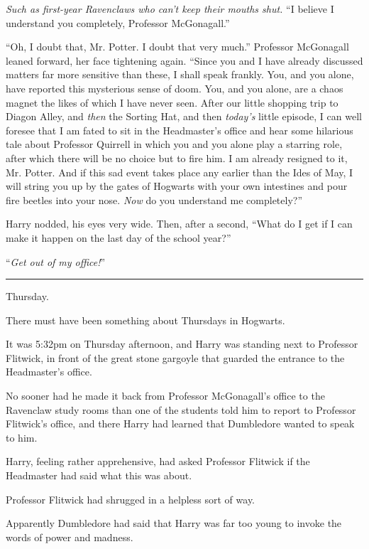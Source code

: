 \emph{Such as first-year Ravenclaws who can't keep their mouths shut.} ``I believe I understand you completely, Professor McGonagall.''

``Oh, I doubt that, Mr. Potter. I doubt that very much.'' Professor McGonagall leaned forward, her face tightening again. ``Since you and I have already discussed matters far more sensitive than these, I shall speak frankly. You, and you alone, have reported this mysterious sense of doom. You, and you alone, are a chaos magnet the likes of which I have never seen. After our little shopping trip to Diagon Alley, and \emph{then} the Sorting Hat, and then \emph{today's} little episode, I can well foresee that I am fated to sit in the Headmaster's office and hear some hilarious tale about Professor Quirrell in which you and you alone play a starring role, after which there will be no choice but to fire him. I am already resigned to it, Mr. Potter. And if this sad event takes place any earlier than the Ides of May, I will string you up by the gates of Hogwarts with your own intestines and pour fire beetles into your nose. \emph{Now} do you understand me completely?''

Harry nodded, his eyes very wide. Then, after a second, ``What do I get if I can make it happen on the last day of the school year?''

``\emph{Get out of my office!}''

\begin{center}\rule{3in}{0.4pt}\end{center}

Thursday.

There must have been something about Thursdays in Hogwarts.

It was 5:32pm on Thursday afternoon, and Harry was standing next to Professor Flitwick, in front of the great stone gargoyle that guarded the entrance to the Headmaster's office.

No sooner had he made it back from Professor McGonagall's office to the Ravenclaw study rooms than one of the students told him to report to Professor Flitwick's office, and there Harry had learned that Dumbledore wanted to speak to him.

Harry, feeling rather apprehensive, had asked Professor Flitwick if the Headmaster had said what this was about.

Professor Flitwick had shrugged in a helpless sort of way.

Apparently Dumbledore had said that Harry was far too young to invoke the words of power and madness.

